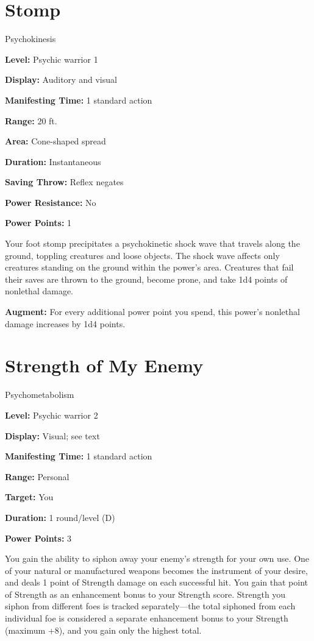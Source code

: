 \documentclass{article}
\begin{document}
\vspace{12pt}
\section*{Stomp}

Psychokinesis

\textbf{Level:} Psychic warrior 1

\textbf{Display:} Auditory and visual

\textbf{Manifesting Time:} 1 standard action

\textbf{Range:} 20 ft.

\textbf{Area:} Cone-shaped spread

\textbf{Duration:} Instantaneous

\textbf{Saving Throw:} Reflex negates

\textbf{Power Resistance:} No

\textbf{Power Points:} 1

Your foot stomp precipitates a psychokinetic shock wave that travels along the 
ground, toppling creatures and loose objects. The shock wave affects only creatures 
standing on the ground within the power's area. Creatures that fail their saves 
are thrown to the ground, become prone, and take 1d4 points of nonlethal damage.

\textbf{Augment:} For every additional power point you spend, this power's nonlethal 
damage increases by 1d4 points.

\vspace{12pt}
\section*{Strength of My Enemy}

Psychometabolism

\textbf{Level:} Psychic warrior 2

\textbf{Display:} Visual; see text

\textbf{Manifesting Time:} 1 standard action

\textbf{Range:} Personal

\textbf{Target:} You

\textbf{Duration:} 1 round/level (D)

\textbf{Power Points:} 3

You gain the ability to siphon away your enemy's strength for your own use. One 
of your natural or manufactured weapons becomes the instrument of your desire, 
and deals 1 point of Strength damage on each successful hit. You gain that point 
of Strength as an enhancement bonus to your Strength score. Strength you siphon 
from different foes is tracked separately---the total siphoned from each individual 
foe is considered a separate enhancement bonus to your Strength (maximum +8), and 
you gain only the highest total.
\end{document}

